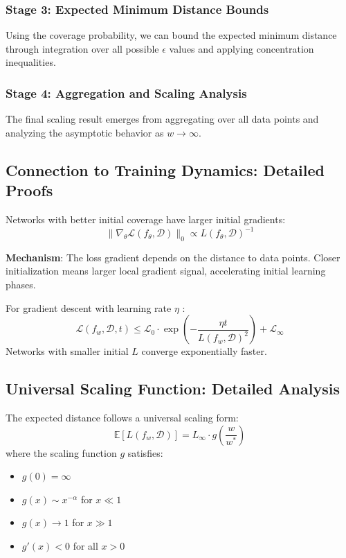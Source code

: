\subsubsection{Stage 3: Expected Minimum Distance Bounds}

Using the coverage probability, we can bound the expected minimum distance through integration over all possible $\epsilon$ values and applying concentration inequalities.

\subsubsection{Stage 4: Aggregation and Scaling Analysis}

The final scaling result emerges from aggregating over all data points and analyzing the asymptotic behavior as $w \to \infty$.

\subsection{Connection to Training Dynamics: Detailed Proofs}
\label{subsec:training-dynamics-proofs}

\begin{theorem}
Networks with better initial coverage have larger initial gradients:
$$\|\nabla_\theta \mathcal{L}(f_\theta, \mathcal{D})\|_0 \propto L(f_\theta, \mathcal{D})^{-1}$$
\end{theorem}

\textbf{Mechanism}: The loss gradient depends on the distance to data points. Closer initialization means larger local gradient signal, accelerating initial learning phases.

\begin{theorem}
For gradient descent with learning rate $\eta$ \cite{Nocedal2018NumericalO}:
$$\mathcal{L}(f_w, \mathcal{D}, t) \leq \mathcal{L}_0 \cdot \exp\left(-\frac{\eta t}{L(f_w, \mathcal{D})^2}\right) + \mathcal{L}_\infty$$
Networks with smaller initial $L$ converge exponentially faster.
\end{theorem}

\subsection{Universal Scaling Function: Detailed Analysis}
\label{subsec:universal-scaling-detailed}

\begin{theorem}
The expected distance follows a universal scaling form:
$$\mathbb{E}[L(f_w, \mathcal{D})] = L_\infty \cdot g\left(\frac{w}{w^*}\right)$$
where the scaling function $g$ satisfies:
\begin{itemize}
    \item $g(0) = \infty$
    \item $g(x) \sim x^{-\alpha}$ for $x \ll 1$
    \item $g(x) \to 1$ for $x \gg 1$
    \item $g'(x) < 0$ for all $x > 0$
\end{itemize}
\end{theorem}

